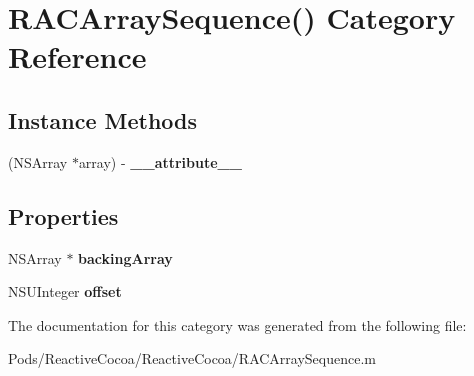 \hypertarget{category_r_a_c_array_sequence_07_08}{}\section{R\+A\+C\+Array\+Sequence() Category Reference}
\label{category_r_a_c_array_sequence_07_08}
\subsection*{Instance Methods}
\begin{DoxyCompactItemize}
\item 
\mbox{\label{category_r_a_c_array_sequence_07_08_a333908cafa42aad6fb1be5bfdc590dcc}} 
(N\+S\+Array $\ast$array) -\/ {\bfseries \+\_\+\+\_\+attribute\+\_\+\+\_\+}
\end{DoxyCompactItemize}
\subsection*{Properties}
\begin{DoxyCompactItemize}
\item 
\mbox{\label{category_r_a_c_array_sequence_07_08_a722d03f99e8137631964583f364f6164}} 
N\+S\+Array $\ast$ {\bfseries backing\+Array}
\item 
\mbox{\label{category_r_a_c_array_sequence_07_08_a94061cc36c8c1903f8d401630a8b30f9}} 
N\+S\+U\+Integer {\bfseries offset}
\end{DoxyCompactItemize}


The documentation for this category was generated from the following file\+:\begin{DoxyCompactItemize}
\item 
Pods/\+Reactive\+Cocoa/\+Reactive\+Cocoa/R\+A\+C\+Array\+Sequence.\+m\end{DoxyCompactItemize}
